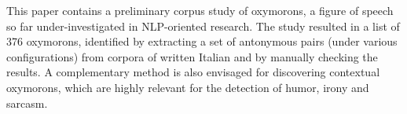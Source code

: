 This paper contains a preliminary corpus study of oxymorons, a figure of speech so far under-investigated in NLP-oriented research. The study resulted in a list of 376 oxymorons, identified by extracting a set of antonymous pairs (under various configurations) from corpora of written Italian and by manually checking the results. A complementary method is also envisaged for discovering contextual oxymorons, which are highly relevant for the detection of humor, irony and sarcasm.
